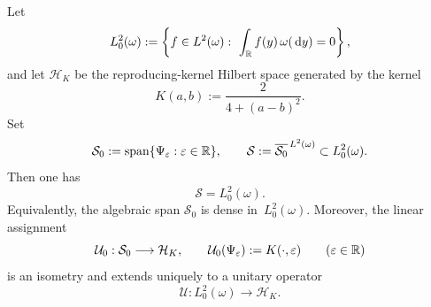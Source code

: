 \begin{theorem}%
\label{thm:mode-space-rkhs}
Let
\[
L^2_0(\omega):=
\left\{
f\in L^2(\omega):\ \int_{\mathbb{R}}f(y)\,\omega(\,\mathrm{d} y)=0
\right\},
\]
and let $\mathcal H_K$ be the reproducing-kernel Hilbert space generated
by the kernel
\[
K(a,b):=\frac{2}{4+(a-b)^2}.
\]
Set
\[
\mathcal S_0:=\operatorname{span}\{\Psi_\varepsilon:\varepsilon\in\mathbb{R}\},
\qquad
\mathcal S:=\overline{\mathcal S_0}^{\,L^2(\omega)}
\subset L^2_0(\omega).
\]
Then one has
\[
\mathcal S=L^2_0(\omega).
\]
Equivalently, the algebraic span
$\mathcal S_0$ is dense in~$L^2_0(\omega)$.
Moreover, the linear assignment
\[
\mathcal U_0:\mathcal S_0\longrightarrow \mathcal H_K,
\qquad
\mathcal U_0(\Psi_\varepsilon):=K(\cdot,\varepsilon)
\qquad(\varepsilon\in\mathbb{R})
\]
is an isometry and extends uniquely to a unitary operator
\[
\mathcal U:L^2_0(\omega)\longrightarrow \mathcal H_K.
\]
\end{theorem}

